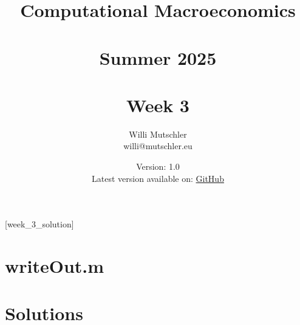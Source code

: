 
\newif\ifDisplaySolutions\DisplaySolutionstrue%


\title{Computational Macroeconomics\\~\\Summer 2025\\~\\Week 3}
\author{Willi Mutschler\\willi@mutschler.eu}
\date{Version: 1.0\\Latest version available on: \href{https://github.com/wmutschl/Computational-Macroeconomics/releases/latest/download/week_3.pdf}{GitHub}}
\maketitle\thispagestyle{empty}

\newpage
{}[week_3_solution]
\tableofcontents\thispagestyle{empty}\newpage

\setcounter{page}{1}
\newpage
\newpage
\newpage
\newpage

\appendix
\section{writeOut.m\label{app:writeOut}}


\printbibliography%
\newpage

\ifDisplaySolutions%
\newpage
\appendix
\section{Solutions}

\fi
